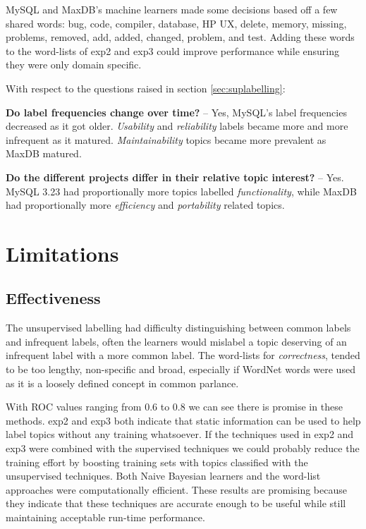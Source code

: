 \documentclass[]{sig-alternate}
\begin{document}
MySQL and MaxDB's machine learners made some decisions based off a few shared words: \textsf{bug, code, compiler, database, HP UX, delete, memory, missing, problems, removed, add, added, changed, problem, and test}. 
Adding these words to the word-lists of \textsf{exp2} and \textsf{exp3} could improve performance while ensuring they were only domain specific.

With respect to the questions raised in section \ref{sec:suplabelling}:

\textbf{Do label frequencies change over time?} -- Yes, MySQL's label
frequencies decreased as it got older. \emph{Usability} and \emph{reliability}
labels became more and more infrequent as it matured. \emph{Maintainability} topics
became more prevalent as MaxDB matured.

\textbf{Do the different projects differ in their relative topic
  interest?} -- Yes. MySQL 3.23 had proportionally more
topics labelled \emph{functionality}, while MaxDB had proportionally more
\emph{efficiency} and \emph{portability} related topics.
 
\section{Limitations}
\label{sec:limit}

\subsection{Effectiveness}

The unsupervised labelling had difficulty distinguishing between common labels and infrequent labels, often the learners would mislabel a topic deserving of an infrequent label with a more common label.
The word-lists for \emph{correctness}, tended to be too lengthy, non-specific and broad, especially if WordNet words were used as it is a loosely defined concept in common parlance.

With ROC values ranging from $0.6$ to $0.8$ we can see there is promise in these methods.
\textsf{exp2} and \textsf{exp3} both indicate that static information can be used to help label topics without any training whatsoever. 
If the techniques used in \textsf{exp2} and \textsf{exp3} were combined with the supervised techniques we could probably reduce the training effort by boosting training sets with topics classified with the unsupervised techniques.
Both Naive Bayesian learners and the word-list approaches were computationally efficient.  
These results are promising because they indicate that these techniques are accurate enough to be useful while still maintaining acceptable run-time performance.
\end{document}
